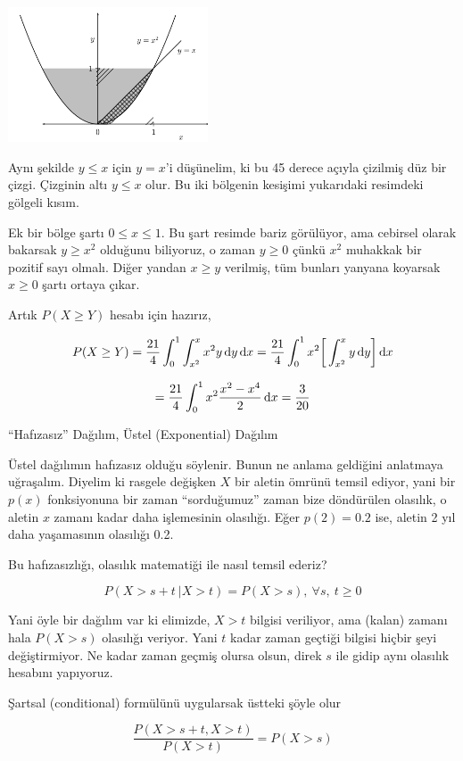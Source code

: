 \documentclass[12pt,fleqn]{article}\usepackage{../../common}
\begin{document}
\includegraphics[height=4cm]{stat_intro_07.png}

Aynı şekilde $y \le x$ için $y = x$'i düşünelim, ki bu 45 derece açıyla
çizilmiş düz bir çizgi. Çizginin altı $y \le x$ olur. Bu iki bölgenin
kesişimi yukarıdaki resimdeki gölgeli kısım. 

Ek bir bölge şartı $0 \le x \le 1$. Bu şart resimde bariz görülüyor, ama
cebirsel olarak bakarsak $y \ge x^2$ olduğunu biliyoruz, o zaman $y \ge 0$
çünkü $x^2$ muhakkak bir pozitif sayı olmalı. Diğer yandan $x \ge y$
verilmiş, tüm bunları yanyana koyarsak $x \ge 0$ şartı ortaya çıkar. 

Artık $P(X \ge Y)$ hesabı için hazırız, 

$$
P(X \ge Y) = 
\frac{ 21}{4} \int_{ 0}^{1} \int _{ x^2}^{x} x^2y \,\mathrm{d} y \,\mathrm{d} x = 
\frac{ 21}{4} \int_{ 0}^{1} x^2 \bigg[ \int _{ x^2}^{x} y \,\mathrm{d} y \bigg] \,\mathrm{d} x 
$$

$$ = \frac{21}{4} \int _{ 0}^{1} x^2 \frac{ x^2 - x^4}{2} \,\mathrm{d} x = \frac{3}{20} $$

``Hafızasız'' Dağılım, Üstel (Exponential) Dağılım

Üstel dağılımın hafızasız olduğu söylenir. Bunun ne anlama geldiğini
anlatmaya uğraşalım. Diyelim ki rasgele değişken $X$ bir aletin ömrünü
temsil ediyor, yani bir $p(x)$ fonksiyonuna bir zaman ``sorduğumuz'' zaman
bize döndürülen olasılık, o aletin $x$ zamanı kadar daha işlemesinin
olasılığı. Eğer $p(2) = 0.2$ ise, aletin 2 yıl daha yaşamasının olasılığı
0.2. 

Bu hafızasızlığı, olasılık matematiği ile nasıl temsil ederiz?

$$ P( X>s+t \ | X>t ) =  P(X>s) , \ \forall s, \ t \ge 0 $$

Yani öyle bir dağılım var ki elimizde, $X>t$ bilgisi veriliyor, ama (kalan)
zamanı hala $P(X>s)$ olasılığı veriyor. Yani $t$ kadar zaman geçtiği 
bilgisi hiçbir şeyi değiştirmiyor. Ne kadar zaman geçmiş olursa olsun,
direk $s$ ile gidip aynı olasılık hesabını yapıyoruz. 

Şartsal (conditional) formülünü uygularsak üstteki şöyle olur

$$  \frac{P( X>s+t,  X>t )}{P(X>t)} = P(X>s)  $$
\end{document}
